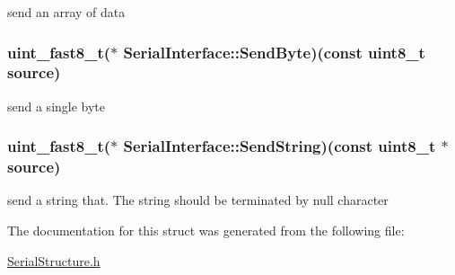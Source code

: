 send an array of data 

\hypertarget{struct_serial_interface_aac8d6d754ee55b326fa8877cf5b51947}{
\subsubsection[{Send\-Byte}]{\setlength{\rightskip}{0pt plus 5cm}uint\-\_\-fast8\-\_\-t($\ast$ Serial\-Interface\-::\-Send\-Byte)(const uint8\-\_\-t source)}}\label{struct_serial_interface_aac8d6d754ee55b326fa8877cf5b51947}


send a single byte 

\hypertarget{struct_serial_interface_a2dc11441227e78ac5a281f88f8fab577}{
\subsubsection[{Send\-String}]{\setlength{\rightskip}{0pt plus 5cm}uint\-\_\-fast8\-\_\-t($\ast$ Serial\-Interface\-::\-Send\-String)(const uint8\-\_\-t $\ast$source)}}\label{struct_serial_interface_a2dc11441227e78ac5a281f88f8fab577}


send a string that. The string should be terminated by null character 



The documentation for this struct was generated from the following file\-:\begin{DoxyCompactItemize}
\item 
\hyperlink{_serial_structure_8h}{Serial\-Structure.\-h}\end{DoxyCompactItemize}
